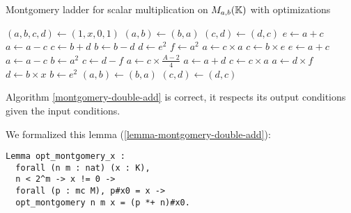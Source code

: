 \begin{algorithm}
\caption{Montgomery ladder for scalar multiplication on $M_{a,b}(\mathbb{K})$ with optimizations}
\label{montgomery-double-add}
\begin{algorithmic}
\STATE $(a,b,c,d) \leftarrow (1,x,0,1)$
    \STATE $(a,b) \leftarrow (b,a)$
    \STATE $(c,d) \leftarrow (d,c)$
  \ENDIF
  \STATE $e \leftarrow a + c$
  \STATE $a \leftarrow a - c$
  \STATE $c \leftarrow b + d$
  \STATE $b \leftarrow b - d$
  \STATE $d \leftarrow e^2$
  \STATE $f \leftarrow a^2$
  \STATE $a \leftarrow c \times a$
  \STATE $c \leftarrow b \times e$
  \STATE $e \leftarrow a + c$
  \STATE $a \leftarrow a - c$
  \STATE $b \leftarrow a^2$
  \STATE $c \leftarrow d-f$
  \STATE $a \leftarrow c\times\frac{A - 2}{4}$
  \STATE $a \leftarrow a + d$
  \STATE $c \leftarrow c \times a$
  \STATE $a \leftarrow d \times f$
  \STATE $d \leftarrow b \times x$
  \STATE $b \leftarrow e^2$
    \STATE $(a,b) \leftarrow (b,a)$
    \STATE $(c,d) \leftarrow (d,c)$
  \ENDIF
\ENDFOR
\end{algorithmic}
\end{algorithm}

\begin{lemma}
\label{lemma-montgomery-double-add}
Algorithm \ref{montgomery-double-add} is correct, \ie it respects its output
conditions given the input conditions.
\end{lemma}


We formalized this lemma (\ref{lemma-montgomery-double-add}):
\begin{lstlisting}[language=Coq]
Lemma opt_montgomery_x :
  forall (n m : nat) (x : K),
  n < 2^m -> x != 0 ->
  forall (p : mc M), p#x0 = x ->
  opt_montgomery n m x = (p *+ n)#x0.
\end{lstlisting}

